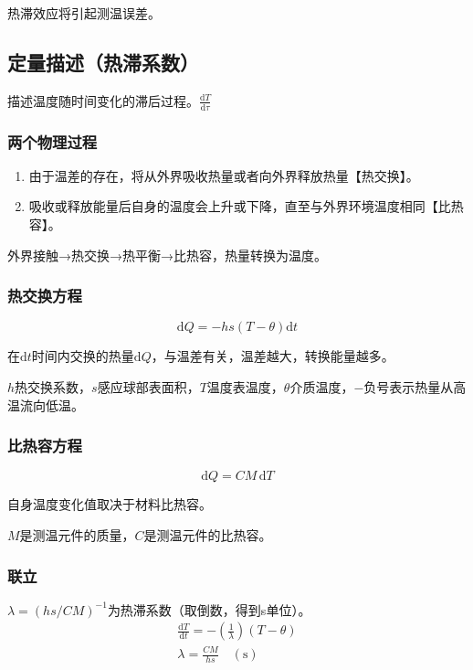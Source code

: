 \documentclass[UTF8,11pt]{ctexbook}
\begin{document}
热滞效应将引起测温误差。

\subsection{定量描述（热滞系数）}

描述温度随时间变化的滞后过程。\(\frac{\mathrm{d}T}{\mathrm{d}\tau}\)

\subsubsection{两个物理过程}
\begin{enumerate}
    \item 由于温差的存在，将从外界吸收热量或者向外界释放热量【热交换】。
    \item 吸收或释放能量后自身的温度会上升或下降，直至与外界环境温度相同【比热容】。
\end{enumerate}

外界接触→热交换→热平衡→比热容，热量转换为温度。

\subsubsection{热交换方程}
\[
\mathrm{d}Q=-hs(T-\theta)\mathrm{d}t
\]

在\(\mathrm{d}t\)时间内交换的热量\(\mathrm{d}Q\)，与温差有关，温差越大，转换能量越多。

\(h\)热交换系数，\(s\)感应球部表面积，\(T\)温度表温度，\(\theta\)介质温度，\(-\)负号表示热量从高温流向低温。

\subsubsection{比热容方程}
\[
\mathrm{d}Q=CM\,\mathrm{d}T
\]

自身温度变化值取决于材料比热容。

\(M\)是测温元件的质量，\(C\)是测温元件的比热容。

\subsubsection{联立}

\(\lambda=(hs/CM)^{-1}\)为热滞系数（取倒数，得到s单位）。
\begin{gather}
    \frac{\mathrm{d}T}{\mathrm{d}t}=-\left(\frac{1}{\lambda}\right)(T-\theta)\\
    \lambda=\frac{CM}{hs}\quad(\mathrm{s})
\end{gather}
\end{document}
